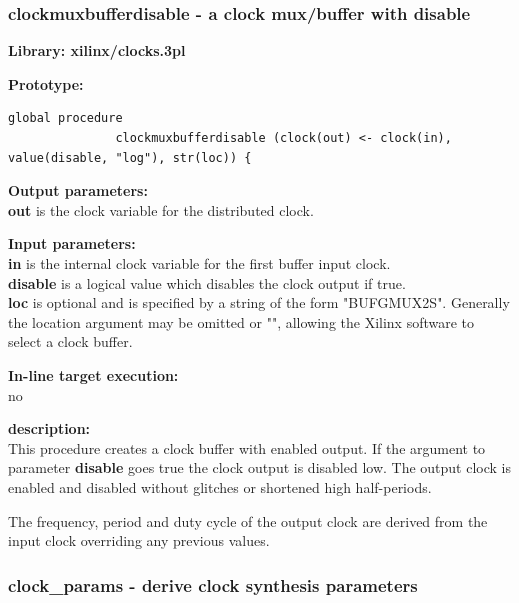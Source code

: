         \subsubsection{clockmuxbufferdisable - a clock mux/buffer with disable}\label{sec:lpclockmuxbufferdis}
            
            {\bf Library: xilinx/clocks.3pl}

            {\bf Prototype:} \\
            \vsp
            \begin{lstlisting}[gobble=12, language=threepl]
               global procedure
               clockmuxbufferdisable (clock(out) <- clock(in), value(disable, "log"), str(loc)) {
            \end{lstlisting}

            {\bf Output parameters:} \\
            {\bf out} is the clock variable for the distributed clock.

            {\bf Input parameters:} \\            
            {\bf in} is the internal clock variable for the first buffer input
            clock.\\
            {\bf disable} is a logical value which disables the clock
            output if true.\\
            {\bf loc} is optional and is specified by a string of the form
            "BUFGMUX2S". Generally the location argument may be omitted or "",
            allowing the Xilinx software to select a clock buffer.
        
            {\bf In-line target execution:} \\
            no

            {\bf description:} \\
            This procedure creates a clock buffer with enabled output. If the
            argument to parameter {\bf disable} goes true the clock output
            is disabled low. The output clock is enabled and disabled without
            glitches or shortened high half-periods.
            
            The frequency, period and duty cycle of the output clock are
            derived from the input clock overriding any previous values.




        \subsubsection{clock\_params - derive clock synthesis parameters}\label{sec:lpclockparams}
            
